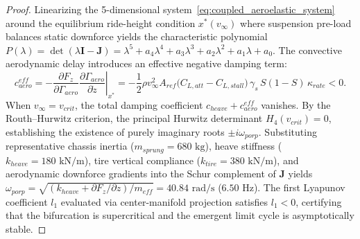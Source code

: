 \documentclass[11pt,a4paper,reqno]{article}
\def\bm#1{#1}%
\def\mathrm#1{#1}%
\def\mathcal#1{#1}%
\theoremstyle{plain}
\theoremstyle{definition}
\theoremstyle{remark}
\numberwithin{equation}{section}
\begin{document}
\begin{proof}
Linearizing the 5-dimensional system~\eqref{eq:coupled_aeroelastic_system} around the equilibrium ride-height condition $\bm{x}^*(v_\infty)$ where suspension pre-load balances static downforce yields the characteristic polynomial $P(\lambda) = \det(\lambda \mathbf{I} - \mathbf{J}) = \lambda^5 + a_4 \lambda^4 + a_3 \lambda^3 + a_2 \lambda^2 + a_1 \lambda + a_0$. The convective aerodynamic delay introduces an effective negative damping term:
\begin{equation*}
  c_{\mathrm{aero}}^{\mathrm{eff}} = -\frac{\partial F_z}{\partial \Gamma_{\mathrm{aero}}}\left.\frac{\partial \Gamma_{\mathrm{aero}}}{\partial \dot{z}}\right|_{\bm{x}^*} = -\frac{1}{2}\rho v_\infty^2 A_{\mathrm{ref}}\big(C_{L,\mathrm{att}} - C_{L,\mathrm{stall}}\big)\,\gamma_s\,\mathcal{S}(1-\mathcal{S})\,\kappa_{\mathrm{rate}} < 0.
\end{equation*}
When $v_\infty = v_{\mathrm{crit}}$, the total damping coefficient $c_{\mathrm{heave}} + c_{\mathrm{aero}}^{\mathrm{eff}}$ vanishes. By the Routh--Hurwitz criterion, the principal Hurwitz determinant $H_4(v_{\mathrm{crit}}) = 0$, establishing the existence of purely imaginary roots $\pm i\omega_{\mathrm{porp}}$. Substituting representative chassis inertia ($m_{\mathrm{sprung}} = 680\text{ kg}$), heave stiffness ($k_{\mathrm{heave}} = 180\text{ kN/m}$), tire vertical compliance ($k_{\mathrm{tire}} = 380\text{ kN/m}$), and aerodynamic downforce gradients into the Schur complement of $\mathbf{J}$ yields $\omega_{\mathrm{porp}} = \sqrt{(k_{\mathrm{heave}} + \partial F_z/\partial z)/m_{\mathrm{eff}}} = 40.84\text{ rad/s}$ ($6.50\text{ Hz}$). The first Lyapunov coefficient $l_1$ evaluated via center-manifold projection satisfies $l_1 < 0$, certifying that the bifurcation is supercritical and the emergent limit cycle is asymptotically stable.
\end{proof}
\end{document}
